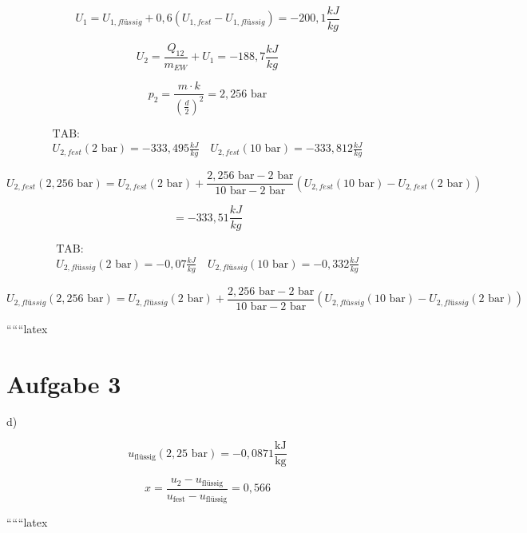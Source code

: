 \[
U_1 = U_{1, flüssig} + 0,6 \left( U_{1, fest} - U_{1, flüssig} \right) = -200,1 \frac{kJ}{kg}
\]

\[
U_2 = \frac{Q_{12}}{m_{EW}} + U_1 = -188,7 \frac{kJ}{kg}
\]

\[
p_2 = \frac{m \cdot k}{\left( \frac{d}{2} \right)^2} = 2,256 \text{ bar}
\]

\[
\begin{array}{c}
\text{TAB:} \\
U_{2, fest} (2 \text{ bar}) = -333,495 \frac{kJ}{kg} \quad U_{2, fest} (10 \text{ bar}) = -333,812 \frac{kJ}{kg}
\end{array}
\]

\[
U_{2, fest} (2,256 \text{ bar}) = U_{2, fest} (2 \text{ bar}) + \frac{2,256 \text{ bar} - 2 \text{ bar}}{10 \text{ bar} - 2 \text{ bar}} \left( U_{2, fest} (10 \text{ bar}) - U_{2, fest} (2 \text{ bar}) \right)
\]

\[
= -333,51 \frac{kJ}{kg}
\]

\[
\begin{array}{c}
\text{TAB:} \\
U_{2, flüssig} (2 \text{ bar}) = -0,07 \frac{kJ}{kg} \quad U_{2, flüssig} (10 \text{ bar}) = -0,332 \frac{kJ}{kg}
\end{array}
\]

\[
U_{2, flüssig} (2,256 \text{ bar}) = U_{2, flüssig} (2 \text{ bar}) + \frac{2,256 \text{ bar} - 2 \text{ bar}}{10 \text{ bar} - 2 \text{ bar}} \left( U_{2, flüssig} (10 \text{ bar}) - U_{2, flüssig} (2 \text{ bar}) \right)
\]

``````latex


\section*{Aufgabe 3}

d)

\[
u_{\text{flüssig}} (2,25 \text{ bar}) = -0{,}0871 \frac{\text{kJ}}{\text{kg}}
\]

\[
x = \frac{u_2 - u_{\text{flüssig}}}{u_{\text{fest}} - u_{\text{flüssig}}} = 0{,}566
\]

``````latex



